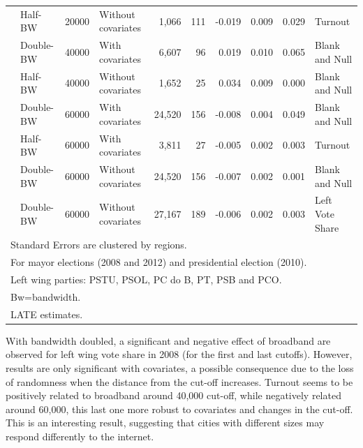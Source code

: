 \documentclass[
  12pt,
]{article}
\begin{document}
\begin{landscape}
\begin{table}[!h]
\begin{tabular}[t]{llllrrrrrl}
 & Half-BW & 20000 & Without covariates & 1,066 & 111 & -0.019 & 0.009 & 0.029 & Turnout\\

 & Double-BW & 40000 & With covariates & 6,607 & 96 & 0.019 & 0.010 & 0.065 & Blank and Null\\

 & Half-BW & 40000 & Without covariates & 1,652 & 25 & 0.034 & 0.009 & 0.000 & Blank and Null\\

 & Double-BW & 60000 & With covariates & 24,520 & 156 & -0.008 & 0.004 & 0.049 & Blank and Null\\

 & Half-BW & 60000 & With covariates & 3,811 & 27 & -0.005 & 0.002 & 0.003 & Turnout\\

 & Double-BW & 60000 & Without covariates & 24,520 & 156 & -0.007 & 0.002 & 0.001 & Blank and Null\\

\multirow{-11}{*}{\raggedright\arraybackslash 2012} & Double-BW & 60000 & Without covariates & 27,167 & 189 & -0.006 & 0.002 & 0.003 & Left Vote Share\\
\bottomrule
\multicolumn{10}{l}{\rule{0pt}{1em}Standard Errors are clustered by regions.}\\
\multicolumn{10}{l}{\rule{0pt}{1em}For mayor elections (2008 and 2012) and presidential election (2010).}\\
\multicolumn{10}{l}{\rule{0pt}{1em}Left wing parties: PSTU, PSOL, PC do B, PT, PSB and PCO.}\\
\multicolumn{10}{l}{\rule{0pt}{1em}Bw=bandwidth.}\\
\multicolumn{10}{l}{\rule{0pt}{1em}LATE estimates.}\\
\end{tabular}
\end{table}
\end{landscape}

With bandwidth doubled, a significant and negative effect of broadband
are observed for left wing vote share in 2008 (for the first and last
cutoffs). However, results are only significant with covariates, a
possible consequence due to the loss of randomness when the distance
from the cut-off increases. Turnout seems to be positively related to
broadband around 40,000 cut-off, while negatively related around 60,000,
this last one more robust to covariates and changes in the cut-off. This
is an interesting result, suggesting that cities with different sizes
may respond differently to the internet.
\end{document}
